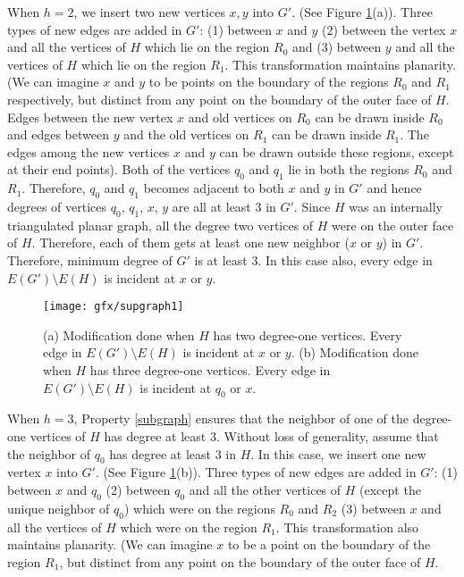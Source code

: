 When $h=2$, we insert two new vertices $x, y$ into $G'$. (See Figure \ref{supgraph1}(a)). Three types of new edges are added in $G'$: 
(1) between $x$ and $y$ (2) between the vertex $x$ and all the vertices of $H$ which lie on the region $R_0$ and (3) between $y$ and all the 
vertices of $H$ which lie on the region $R_1$. This transformation maintains planarity. 
(We can imagine $x$ and $y$ to be points on the boundary of the regions $R_0$ and $R_1$ respectively, but distinct from any point on the boundary 
of the outer face of $H$. Edges between the new vertex $x$ and old vertices on $R_0$ can be drawn inside $R_0$ and edges between $y$ and the old vertices 
on $R_1$ can be drawn inside $R_1$. The edges among the new vertices $x$ and $y$ can be drawn outside these regions, except at their end points). 
Both of the vertices $q_0$ and $q_1$ lie in both the regions $R_0$ and $R_1$. Therefore, $q_0$ and $q_1$ becomes adjacent to both $x$ and $y$ in $G'$ 
and hence degrees of vertices $q_0$, $q_1$, $x$, $y$ are all at least $3$ in $G'$. Since $H$ was an internally triangulated planar graph, all the degree 
two vertices of $H$ were on the outer face of $H$. Therefore, each of them gets at least one new neighbor ($x$ 
or $y$) in $G'$. Therefore, minimum degree of $G'$ is at least $3$. In this case also, every edge in $E(G')\setminus E(H)$ is incident at $x$ or $y$. 
\begin{figure}[h]
  \centering
  \texttt{[image: gfx/supgraph1]}   %
  \caption[Modifications]{(a) Modification done when $H$ has two degree-one vertices. Every edge in $E(G')\setminus E(H)$ is incident at $x$ or $y$. 
(b) Modification done when $H$ has three degree-one vertices. Every edge in $E(G')\setminus E(H)$ is incident at $q_0$ or $x$.}
\label{supgraph1}
  \end{figure} 
When $h=3$, Property \ref{subgraph} ensures that the neighbor of one of the degree-one vertices of $H$ has degree at least $3$. 
Without loss of generality, assume that the neighbor of $q_0$ has degree at least $3$ in $H$. In this case, we insert one new vertex $x$ into $G'$. 
(See Figure \ref{supgraph1}(b)). Three types of new edges are added in $G'$: (1) between $x$ and $q_0$ 
(2) between $q_0$ and all the other vertices of $H$ (except the unique neighbor of $q_0$) which were on the regions $R_0$ and $R_2$ 
(3) between $x$ and all the vertices of $H$ which were on the region $R_1$. This transformation also maintains planarity. 
(We can imagine $x$ to be a point on the boundary of the region $R_1$, but distinct from any point on the boundary of the outer face of $H$. 
